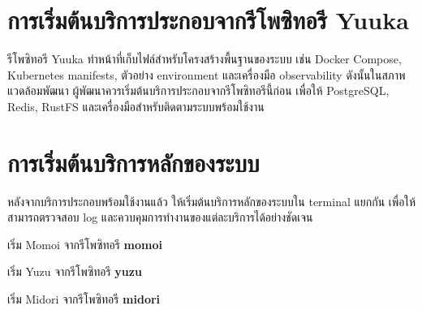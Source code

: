 \vspace{-0.5in}

\section{การเริ่มต้นบริการประกอบจากรีโพซิทอรี Yuuka}
\hspace*{1.3em}
รีโพซิทอรี Yuuka ทำหน้าที่เก็บไฟล์สำหรับโครงสร้างพื้นฐานของระบบ เช่น Docker Compose, Kubernetes manifests, ตัวอย่าง environment และเครื่องมือ observability ดังนั้นในสภาพแวดล้อมพัฒนา ผู้พัฒนาควรเริ่มต้นบริการประกอบจากรีโพซิทอรีนี้ก่อน เพื่อให้ PostgreSQL, Redis, RustFS และเครื่องมือสำหรับติดตามระบบพร้อมใช้งาน

\begin{figure}[htbp]
\centering
{}
\caption{}
\label{figG:StartInfra}
\end{figure}

\section{การเริ่มต้นบริการหลักของระบบ}
\hspace*{1.3em}
หลังจากบริการประกอบพร้อมใช้งานแล้ว ให้เริ่มต้นบริการหลักของระบบใน terminal แยกกัน เพื่อให้สามารถตรวจสอบ log และควบคุมการทำงานของแต่ละบริการได้อย่างชัดเจน

\begin{mycustomenum2}
    \item เริ่ม Momoi จากรีโพซิทอรี \textbf{momoi}
    \item เริ่ม Yuzu จากรีโพซิทอรี \textbf{yuzu}
    \item เริ่ม Midori จากรีโพซิทอรี \textbf{midori}
\end{mycustomenum2}

\begin{figure}[htbp]
\centering
{}
\caption{}
\label{figG:StartMomoi}
\end{figure}

